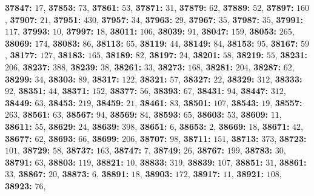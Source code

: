 \textsf{\bfseries 37847:} $17$, \textsf{\bfseries 37853:} $73$, \textsf{\bfseries 37861:} $53$, \textsf{\bfseries 37871:} $31$, \textsf{\bfseries 37879:} $62$, \textsf{\bfseries 37889:} $52$, \textsf{\bfseries 37897:} $160$, \textsf{\bfseries 37907:} $21$, \textsf{\bfseries 37951:} $430$, \textsf{\bfseries 37957:} $34$, \textsf{\bfseries 37963:} $29$, \textsf{\bfseries 37967:} $35$, \textsf{\bfseries 37987:} $35$, \textsf{\bfseries 37991:} $117$, \textsf{\bfseries 37993:} $10$, \textsf{\bfseries 37997:} $18$, \textsf{\bfseries 38011:} $106$, \textsf{\bfseries 38039:} $91$, \textsf{\bfseries 38047:} $159$, \textsf{\bfseries 38053:} $265$, \textsf{\bfseries 38069:} $174$, \textsf{\bfseries 38083:} $86$, \textsf{\bfseries 38113:} $65$, \textsf{\bfseries 38119:} $44$, \textsf{\bfseries 38149:} $84$, \textsf{\bfseries 38153:} $95$, \textsf{\bfseries 38167:} $59$, \textsf{\bfseries 38177:} $127$, \textsf{\bfseries 38183:} $165$, \textsf{\bfseries 38189:} $82$, \textsf{\bfseries 38197:} $24$, \textsf{\bfseries 38201:} $58$, \textsf{\bfseries 38219:} $55$, \textsf{\bfseries 38231:} $206$, \textsf{\bfseries 38237:} $388$, \textsf{\bfseries 38239:} $38$, \textsf{\bfseries 38261:} $33$, \textsf{\bfseries 38273:} $168$, \textsf{\bfseries 38281:} $204$, \textsf{\bfseries 38287:} $62$, \textsf{\bfseries 38299:} $34$, \textsf{\bfseries 38303:} $89$, \textsf{\bfseries 38317:} $122$, \textsf{\bfseries 38321:} $57$, \textsf{\bfseries 38327:} $22$, \textsf{\bfseries 38329:} $312$, \textsf{\bfseries 38333:} $92$, \textsf{\bfseries 38351:} $44$, \textsf{\bfseries 38371:} $152$, \textsf{\bfseries 38377:} $56$, \textsf{\bfseries 38393:} $67$, \textsf{\bfseries 38431:} $94$, \textsf{\bfseries 38447:} $312$, \textsf{\bfseries 38449:} $63$, \textsf{\bfseries 38453:} $219$, \textsf{\bfseries 38459:} $21$, \textsf{\bfseries 38461:} $83$, \textsf{\bfseries 38501:} $107$, \textsf{\bfseries 38543:} $19$, \textsf{\bfseries 38557:} $263$, \textsf{\bfseries 38561:} $63$, \textsf{\bfseries 38567:} $94$, \textsf{\bfseries 38569:} $84$, \textsf{\bfseries 38593:} $65$, \textsf{\bfseries 38603:} $53$, \textsf{\bfseries 38609:} $11$, \textsf{\bfseries 38611:} $55$, \textsf{\bfseries 38629:} $24$, \textsf{\bfseries 38639:} $398$, \textsf{\bfseries 38651:} $6$, \textsf{\bfseries 38653:} $2$, \textsf{\bfseries 38669:} $18$, \textsf{\bfseries 38671:} $42$, \textsf{\bfseries 38677:} $62$, \textsf{\bfseries 38693:} $66$, \textsf{\bfseries 38699:} $206$, \textsf{\bfseries 38707:} $98$, \textsf{\bfseries 38711:} $151$, \textsf{\bfseries 38713:} $373$, \textsf{\bfseries 38723:} $101$, \textsf{\bfseries 38729:} $58$, \textsf{\bfseries 38737:} $163$, \textsf{\bfseries 38747:} $7$, \textsf{\bfseries 38749:} $26$, \textsf{\bfseries 38767:} $199$, \textsf{\bfseries 38783:} $30$, \textsf{\bfseries 38791:} $63$, \textsf{\bfseries 38803:} $119$, \textsf{\bfseries 38821:} $10$, \textsf{\bfseries 38833:} $319$, \textsf{\bfseries 38839:} $107$, \textsf{\bfseries 38851:} $31$, \textsf{\bfseries 38861:} $33$, \textsf{\bfseries 38867:} $20$, \textsf{\bfseries 38873:} $6$, \textsf{\bfseries 38891:} $18$, \textsf{\bfseries 38903:} $172$, \textsf{\bfseries 38917:} $11$, \textsf{\bfseries 38921:} $108$, \textsf{\bfseries 38923:} $76$, 
